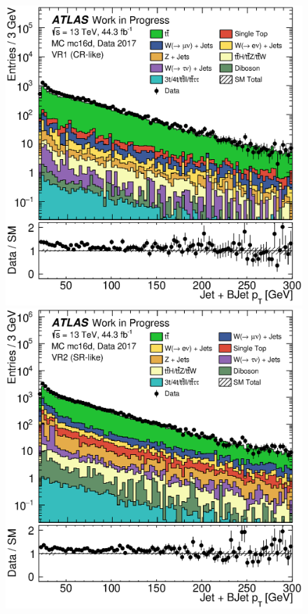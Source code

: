 \begin{figure}[th!]
    \includegraphics[width=\individualPlotWidth]{Assets/Plots/VR1/h_stack_mc16d_data17_jet_tot_pt.eps}
    \hspace{1em}
    \includegraphics[width=\individualPlotWidth]{Assets/Plots/VR2/h_stack_mc16d_data17_jet_tot_pt.eps}

    \label{fig:ch6:VRs_distributions}
\end{figure}

